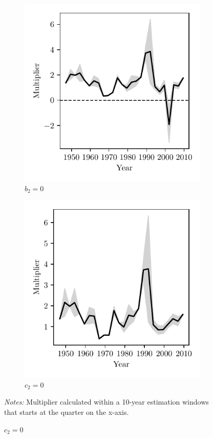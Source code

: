 \begin{figure}[t]
    \centering
    \caption{Estimated multiplier for different estimation windows}
    \begin{subfigure}{0.475\textwidth}
        \includegraphics{figures/b20_ts.pdf}
        \caption{$b_2 = 0$}
    \end{subfigure}
    \begin{subfigure}{0.475\textwidth}
        \includegraphics{figures/c20_ts.pdf}
        \caption{$c_2 = 0$}
    \end{subfigure}

    {\scriptsize \emph{Notes:} Multiplier calculated within a 10-year estimation windows that starts at the quarter on the x-axis.}
    \label{fig:ts}
\end{figure}

